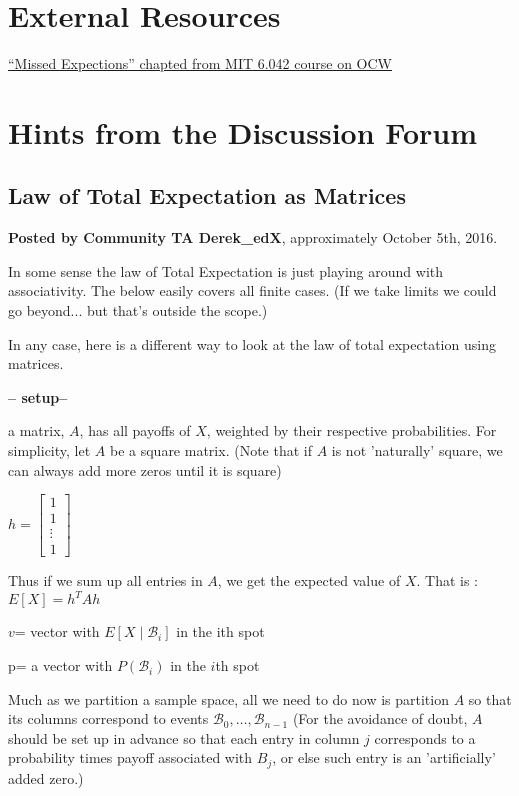 \documentclass[6008notes.tex]{subfiles}
\begin{document}
\graphicspath{ {images/suppl/} }

\section{External Resources}

\href{https://ocw.mit.edu/courses/electrical-engineering-and-computer-science/6-042j-mathematics-for-computer-science-fall-2005/readings/ln14.pdf}{``Missed Expections'' chapted from MIT 6.042 course on OCW}

\section{Hints from the Discussion Forum}

\subsection{Law of Total Expectation as Matrices}

\textbf{Posted by Community TA Derek\_edX}, approximately October 5th, 2016.

In some sense the law of Total Expectation is just playing around with associativity. The below easily covers all finite cases. (If we take limits we could go beyond... but that's outside the scope.)

In any case, here is a different way to look at the law of total expectation using matrices.

\textbf{-- setup--}

a matrix, $A$, has all payoffs of $X$, weighted by their respective probabilities. For simplicity, let $A$ be a square matrix. (Note that if $A$ is not 'naturally' square, we can always add more zeros until it is square)

$h = \begin{bmatrix}
1\\ 
1\\ 
\vdots\\ 
1
\end{bmatrix}$

Thus if we sum up all entries in $A$, we get the expected value of $X$. 
That is : $E[X] = h^{T} A h$

$v$= vector with ${E}[X\mid \mathcal{B}_{i}]$ in the ith spot

p= a vector with ${P}(\mathcal{B}_{i})$ in the $i$th spot

Much as we partition a sample space, all we need to do now is partition $A$ so that its columns correspond to events $\mathcal{B}_{0},\dots ,\mathcal{B}_{n-1}$ (For the avoidance of doubt, $A$ should be set up in advance so that each entry in column $j$ corresponds to a probability times payoff associated with $B_j$, or else such entry is an 'artificially' added zero.)
\end{document}
